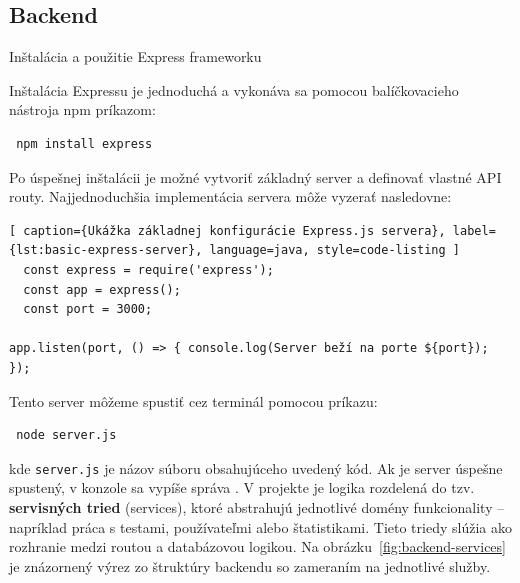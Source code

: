 \subsection{Backend}
 Inštalácia a použitie Express frameworku
 \newline

Inštalácia Expressu je jednoduchá a vykonáva sa pomocou balíčkovacieho nástroja \acrshort{npm} príkazom:

\begin{verbatim} npm install express \end{verbatim}

Po úspešnej inštalácii je možné vytvoriť základný server a definovať vlastné API routy. Najjednoduchšia implementácia servera môže vyzerať nasledovne:

\begin{lstlisting}[ caption={Ukážka základnej konfigurácie Express.js servera}, label={lst:basic-express-server}, language=java, style=code-listing ] 
  const express = require('express'); 
  const app = express(); 
  const port = 3000;

app.listen(port, () => { console.log(Server beží na porte ${port}); }); 
\end{lstlisting}

Tento server môžeme spustiť cez terminál pomocou príkazu:

\begin{verbatim} node server.js \end{verbatim}

kde \texttt{server.js} je názov súboru obsahujúceho uvedený kód. Ak je server úspešne spustený, v konzole sa vypíše správa .
 V projekte je logika rozdelená do tzv. \textbf{servisných tried} (services), ktoré abstrahujú jednotlivé domény funkcionality – napríklad práca s testami, používateľmi alebo štatistikami. 
 Tieto triedy slúžia ako rozhranie medzi routou a databázovou logikou. 
Na obrázku~\ref{fig:backend-services} je znázornený výrez zo štruktúry backendu so zameraním na jednotlivé služby.


